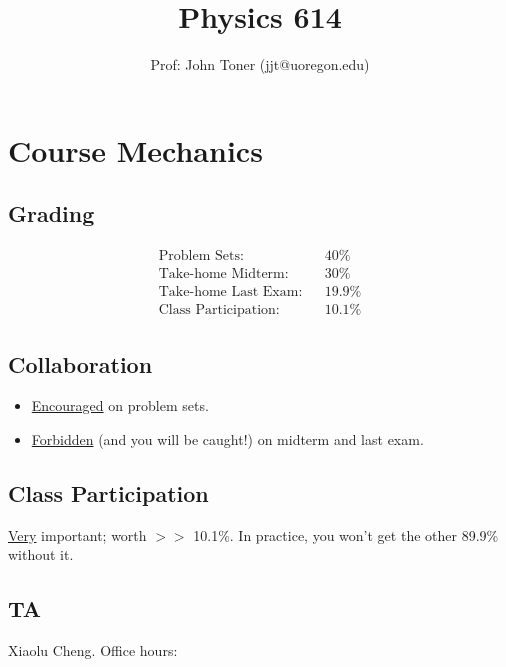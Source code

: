 \documentclass[12pt]{article}
\begin{document}
\title{Physics 614}
\author{Prof: John Toner (jjt@uoregon.edu)}
\maketitle

\section*{Course Mechanics}
\subsection*{Grading}
\begin{align*}
\text{Problem Sets:} && 40\% \\
\text{Take-home Midterm:} && 30\% \\
\text{Take-home Last Exam:} && 19.9\% \\
\text{Class Participation:} && 10.1\%
\end{align*}

\subsection*{Collaboration}
\begin{itemize}
    \item \underline{Encouraged} on problem sets.
    \item \underline{Forbidden} (and you will be caught!) on midterm and last exam.
\end{itemize}

\subsection*{Class Participation}
\underline{Very} important; worth $>>$ 10.1\%. In practice, you won't get the other 89.9\% without it.

\subsection*{TA}
Xiaolu Cheng. Office hours:
\end{document}
